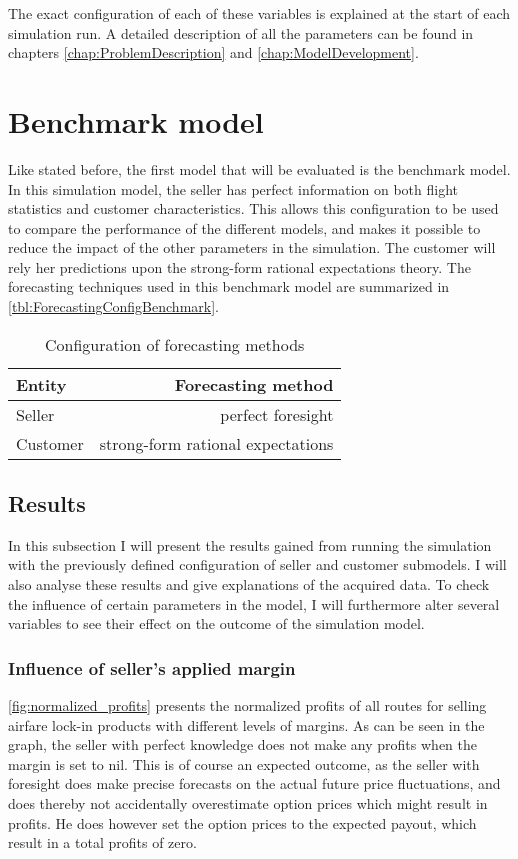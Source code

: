 The exact configuration of each of these variables is explained at the start of each simulation run. A detailed description of all the parameters can be found in chapters \ref{chap:ProblemDescription} and \ref{chap:ModelDevelopment}.



\section{Benchmark model}
Like stated before, the first model that will be evaluated is the benchmark model. In this simulation model, the seller has perfect information on both flight statistics and customer characteristics. This allows this configuration to be used to compare the performance of the different models, and makes it possible to reduce the impact of the other parameters in the simulation. The customer will rely her predictions upon the strong-form rational expectations theory. The forecasting techniques used in this benchmark model are summarized in \autoref{tbl:ForecastingConfigBenchmark}.

\begin{table}
    \centering
    \begin{tabular}{l  r}
    \toprule
    Entity      &  Forecasting method \\
    \midrule
    Seller    &  perfect foresight  \\
    Customer  &  strong-form rational expectations \\
    \bottomrule
    \end{tabular}
    \caption{Configuration of forecasting methods}
    \label{tbl:ForecastingConfigBenchmark}
\end{table}


\subsection{Results}
In this subsection I will present the results gained from running the simulation with the previously defined configuration of seller and customer submodels. I will also analyse these results and give explanations of the acquired data. To check the influence of certain parameters in the model, I will furthermore alter several variables to see their effect on the outcome of the simulation model.

\subsubsection{Influence of seller's applied margin}
\autoref{fig:normalized_profits} presents the normalized profits of all routes for selling airfare lock-in products with different levels of margins. As can be seen in the graph, the seller with perfect knowledge does not make any profits when the margin is set to nil. This is of course an expected outcome, as the seller with foresight does make precise forecasts on the actual future price fluctuations, and does thereby not accidentally overestimate option prices which might result in profits. He does however set the option prices to the expected payout, which result in a total profits of zero.


